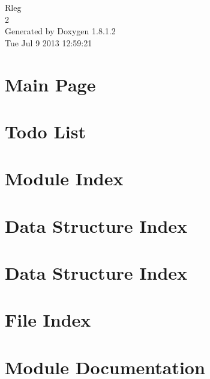 \documentclass{book}
\begin{document}
\hypersetup{pageanchor=false,citecolor=blue}
\begin{titlepage}
\vspace*{7cm}
\begin{center}
{\Large Rleg \\[1ex]\large 2 }\\
\vspace*{1cm}
{\large Generated by Doxygen 1.8.1.2}\\
\vspace*{0.5cm}
{\small Tue Jul 9 2013 12:59:21}\\
\end{center}
\end{titlepage}
\clearemptydoublepage
{}
\tableofcontents
\clearemptydoublepage
{}
\hypersetup{pageanchor=true,citecolor=blue}
\chapter{Main Page}
\label{index}\hypertarget{index}{}
\chapter{Todo List}
\label{todo}
\hypertarget{todo}{}

\chapter{Module Index}

\chapter{Data Structure Index}

\chapter{Data Structure Index}

\chapter{File Index}

\chapter{Module Documentation}





\end{document}
